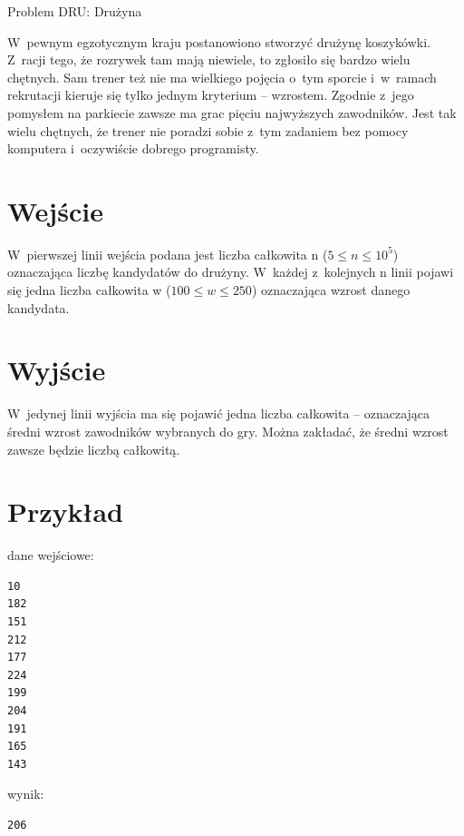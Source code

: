 \documentclass{article}
\begin{document}
\begin{center}
  \begin{Huge}
    Problem DRU: Drużyna
  \end{Huge}
\end{center}

W~pewnym egzotycznym kraju postanowiono stworzyć drużynę koszykówki. Z~racji tego, że
rozrywek tam mają niewiele, to zgłosiło się bardzo wielu chętnych. Sam trener też nie ma wielkiego
pojęcia o~tym sporcie i~w~ramach rekrutacji kieruje się tylko jednym kryterium – wzrostem.
Zgodnie z~jego pomysłem na parkiecie zawsze ma grac pięciu najwyższych zawodników. Jest tak
wielu chętnych, że trener nie poradzi sobie z~tym zadaniem bez pomocy komputera i~oczywiście
dobrego programisty.

\section*{Wejście}

W~pierwszej linii wejścia podana jest liczba całkowita n ($5 \leqslant n \leqslant 10^5$) oznaczająca liczbę
kandydatów do drużyny. W~każdej z~kolejnych n linii pojawi się jedna liczba całkowita w
($100 \leqslant w \leqslant 250$) oznaczająca wzrost danego kandydata.

\section*{Wyjście}

W~jedynej linii wyjścia ma się pojawić jedna liczba całkowita – oznaczająca średni wzrost
zawodników wybranych do gry. Można zakładać, że średni wzrost zawsze będzie liczbą całkowitą.

\section*{Przykład}
dane wejściowe:
\begin{verbatim}
10
182
151
212
177
224
199
204
191
165
143
\end{verbatim}
wynik:
\begin{verbatim}
206
\end{verbatim}
\end{document}
